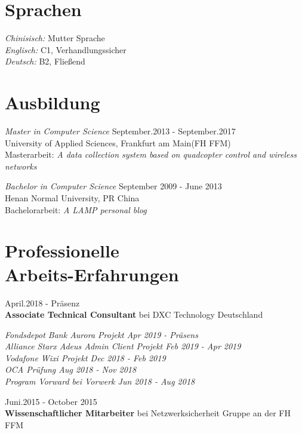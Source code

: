 \documentclass[margin, 10pt]{res} %
\begin{document}
\begin{resume}
\section{Sprachen} 
{\sl Chinisisch:} 		\hfill Mutter Sprache\\
{\sl Englisch:} 			\hfill C1, Verhandlungssicher\\
{\sl Deutsch:} 		\hfill B2, Fließend
\section{Ausbildung}
{\sl Master in Computer Science} \hfill  September.2013 - September.2017\\
University of Applied Sciences, Frankfurt am Main(FH FFM)\\
Masterarbeit: \textit{A data collection system based on quadcopter control and wireless networks}

{\sl Bachelor in Computer Science} \hfill September 2009 - June 2013 \\
Henan Normal University, PR China\\
Bachelorarbeit: \textit{A LAMP personal blog}


\section{Professionelle \\ Arbeits-Erfahrungen} 

April.2018 - Präsenz\\
{\bf Associate Technical Consultant} bei DXC Technology Deutschland

{\sl Fondsdepot Bank Aurora Projekt \hfill Apr 2019 - Präsens}\\
{\sl Alliance Starx Adeus Admin Client Projekt	\hfill Feb 2019 - Apr 2019}\\
{\sl Vodafone Wixi Projekt \hfill  Dec 2018 - Feb 2019}\\
{\sl OCA Prüfung \hfill Aug 2018 - Nov 2018}  \\
{\sl Program Vorward bei Vorwerk \hfill Jun 2018 - Aug 2018}

Juni.2015 - October 2015\\
{\bf Wissenschaftlicher Mitarbeiter} bei Netzwerksicherheit Gruppe an der FH FFM

\clearpage
% 
\end{resume}
\end{document}
